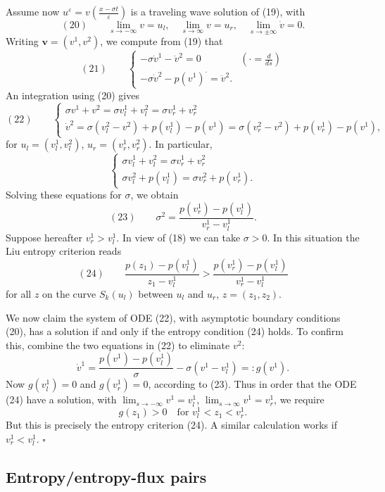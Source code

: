 \begin{example}
Assume now $u^\varepsilon = v\left(\frac{x-\sigma t}{\varepsilon}\right)$ is a traveling wave solution of (19), with
$$(20) \qquad \lim_{s\to-\infty} v = u_l, \quad \lim_{s\to\infty} v = u_r, \quad \lim_{s\to\pm\infty} \dot v = 0.$$
Writing $\mathbf{v} = (v^1,v^2)$, we compute from (19) that
$$(21) \qquad \begin{cases} -\sigma\dot v^1 - \dot v^2 = 0 & \left(\cdot = \frac{d}{ds}\right) \\ -\sigma\dot v^2 - p(v^1)^\cdot = \ddot v^2. \end{cases}$$
An integration using (20) gives
$$(22) \qquad \begin{cases} \sigma v^1 + v^2 = \sigma v^1_l + v^2_l = \sigma v^1_r + v^2_r \\ \dot v^2 = \sigma(v^2_l-v^2) + p(v^1_l) - p(v^1) = \sigma(v^2_r-v^2) + p(v^1_r) - p(v^1), \end{cases}$$
for $u_l=(v^1_l,v^2_l)$, $u_r=(v^1_r,v^2_r)$. In particular,
$$\begin{cases} \sigma v^1_l + v^2_l = \sigma v^1_r + v^2_r \\ \sigma v^2_l + p(v^1_l) = \sigma v^2_r + p(v^1_r). \end{cases}$$
Solving these equations for $\sigma$, we obtain
$$(23) \qquad \sigma^2 = \frac{p(v^1_r)-p(v^1_l)}{v^1_r - v^1_l}.$$
Suppose hereafter $v^1_r > v^1_l$. In view of (18) we can take $\sigma>0$. In this situation the Liu entropy criterion reads
$$(24) \qquad \frac{p(z_1)-p(v^1_l)}{z_1-v^1_l} > \frac{p(v^1_r)-p(v^1_l)}{v^1_r-v^1_l}$$
for all $z$ on the curve $S_k(u_l)$ between $u_l$ and $u_r$, $z=(z_1,z_2)$.

We now claim the system of ODE (22), with asymptotic boundary conditions (20), has a solution if and only if the entropy condition (24) holds. To confirm this, combine the two equations in (22) to eliminate $v^2$:
$$\dot v^1 = \frac{p(v^1)-p(v^1_l)}{\sigma} - \sigma(v^1-v^1_l) =: g(v^1).$$
Now $g(v^1_l)=0$ and $g(v^1_r)=0$, according to (23). Thus in order that the ODE (24) have a solution, with $\lim_{s\to-\infty} v^1 = v^1_l$, $\lim_{s\to\infty} v^1 = v^1_r$, we require
$$g(z_1) > 0 \quad \text{for } v^1_l < z_1 < v^1_r.$$
But this is precisely the entropy criterion (24). A similar calculation works if $v^1_r < v^1_l$. $\square$
\end{example}

\subsection{Entropy/entropy-flux pairs}\label{sec:entropy-entropy-flux-pairs}


